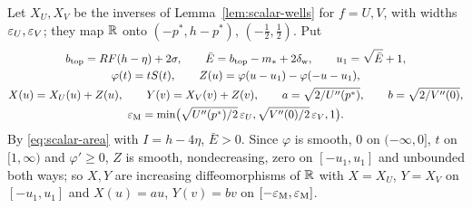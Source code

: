 Let $X_U,X_V$ be the inverses of Lemma~\ref{lem:scalar-wells} for $f=U,V$, with widths $\varepsilon_U,\varepsilon_V$; they map $\mathbb{R}$ onto $(-p^*,h-p^*)$, $(-\frac12,\frac12)$. Put
\begin{gather}\label{eq:scalar-endpoint-data}
 b_{\rm top}=RF(h-\eta)+2\sigma,\qquad
 \bar E=b_{\rm top}-m_*+2\delta_{\rm w},\qquad u_1=\sqrt{\bar E}+1,\\
 \varphi(t)=tS(t),\qquad Z(u)=\varphi(u-u_1)-\varphi(-u-u_1),\notag\\
 X(u)=X_U(u)+Z(u),\qquad Y(v)=X_V(v)+Z(v),\qquad
 a=\sqrt{2/U''(p^*)},\qquad b=\sqrt{2/V''(0)},\notag\\
 \varepsilon_{\rm M}=\min\bigl(\sqrt{U''(p^*)/2}\,\varepsilon_U,
                          \sqrt{V''(0)/2}\,\varepsilon_V,1\bigr).\notag
\end{gather}
By \eqref{eq:scalar-area} with $I=h-4\eta$, $\bar E>0$. Since $\varphi$ is smooth, $0$ on $(-\infty,0]$, $t$ on $[1,\infty)$ and $\varphi'\ge0$, $Z$ is smooth, nondecreasing, zero on $[-u_1,u_1]$ and unbounded both ways; so $X,Y$ are increasing diffeomorphisms of $\mathbb{R}$ with $X=X_U$, $Y=X_V$ on $[-u_1,u_1]$ and $X(u)=au$, $Y(v)=bv$ on $[-\varepsilon_{\rm M},\varepsilon_{\rm M}]$.

